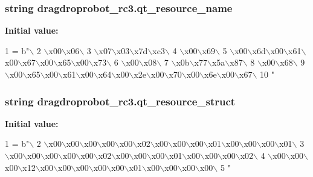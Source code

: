 \subsubsection[{qt\+\_\+resource\+\_\+name}]{\setlength{\rightskip}{0pt plus 5cm}string dragdroprobot\+\_\+rc3.\+qt\+\_\+resource\+\_\+name}\label{namespacedragdroprobot__rc3_aa849a56ade008373ffcc918be6477017}
{\bfseries Initial value\+:}
\begin{DoxyCode}
1 = b\textcolor{stringliteral}{"\(\backslash\)}
2 \textcolor{stringliteral}{\(\backslash\)x00\(\backslash\)x06\(\backslash\)}
3 \textcolor{stringliteral}{\(\backslash\)x07\(\backslash\)x03\(\backslash\)x7d\(\backslash\)xc3\(\backslash\)}
4 \textcolor{stringliteral}{\(\backslash\)x00\(\backslash\)x69\(\backslash\)}
5 \textcolor{stringliteral}{\(\backslash\)x00\(\backslash\)x6d\(\backslash\)x00\(\backslash\)x61\(\backslash\)x00\(\backslash\)x67\(\backslash\)x00\(\backslash\)x65\(\backslash\)x00\(\backslash\)x73\(\backslash\)}
6 \textcolor{stringliteral}{\(\backslash\)x00\(\backslash\)x08\(\backslash\)}
7 \textcolor{stringliteral}{\(\backslash\)x0b\(\backslash\)x77\(\backslash\)x5a\(\backslash\)x87\(\backslash\)}
8 \textcolor{stringliteral}{\(\backslash\)x00\(\backslash\)x68\(\backslash\)}
9 \textcolor{stringliteral}{\(\backslash\)x00\(\backslash\)x65\(\backslash\)x00\(\backslash\)x61\(\backslash\)x00\(\backslash\)x64\(\backslash\)x00\(\backslash\)x2e\(\backslash\)x00\(\backslash\)x70\(\backslash\)x00\(\backslash\)x6e\(\backslash\)x00\(\backslash\)x67\(\backslash\)}
10 \textcolor{stringliteral}{"}
\end{DoxyCode}
\hypertarget{namespacedragdroprobot__rc3_a2765bdeadc6c108631a3fe2c2f580963}{}
\subsubsection[{qt\+\_\+resource\+\_\+struct}]{\setlength{\rightskip}{0pt plus 5cm}string dragdroprobot\+\_\+rc3.\+qt\+\_\+resource\+\_\+struct}\label{namespacedragdroprobot__rc3_a2765bdeadc6c108631a3fe2c2f580963}
{\bfseries Initial value\+:}
\begin{DoxyCode}
1 = b\textcolor{stringliteral}{"\(\backslash\)}
2 \textcolor{stringliteral}{\(\backslash\)x00\(\backslash\)x00\(\backslash\)x00\(\backslash\)x00\(\backslash\)x00\(\backslash\)x02\(\backslash\)x00\(\backslash\)x00\(\backslash\)x00\(\backslash\)x01\(\backslash\)x00\(\backslash\)x00\(\backslash\)x00\(\backslash\)x01\(\backslash\)}
3 \textcolor{stringliteral}{\(\backslash\)x00\(\backslash\)x00\(\backslash\)x00\(\backslash\)x00\(\backslash\)x00\(\backslash\)x02\(\backslash\)x00\(\backslash\)x00\(\backslash\)x00\(\backslash\)x01\(\backslash\)x00\(\backslash\)x00\(\backslash\)x00\(\backslash\)x02\(\backslash\)}
4 \textcolor{stringliteral}{\(\backslash\)x00\(\backslash\)x00\(\backslash\)x00\(\backslash\)x12\(\backslash\)x00\(\backslash\)x00\(\backslash\)x00\(\backslash\)x00\(\backslash\)x00\(\backslash\)x01\(\backslash\)x00\(\backslash\)x00\(\backslash\)x00\(\backslash\)x00\(\backslash\)}
5 \textcolor{stringliteral}{"}
\end{DoxyCode}
